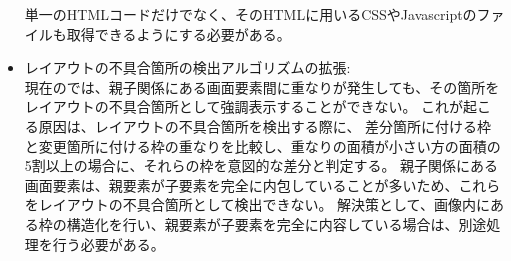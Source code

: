 \begin{itemize}
            単一のHTMLコードだけでなく、そのHTMLに用いるCSSやJavascriptのファイルも取得できるようにする必要がある。
      \item レイアウトの不具合箇所の検出アルゴリズムの拡張:\\
            現在の\toolName では、親子関係にある画面要素間に重なりが発生しても、その箇所をレイアウトの不具合箇所として強調表示することができない。
            これが起こる原因は、レイアウトの不具合箇所を検出する際に、
            差分箇所に付ける枠と変更箇所に付ける枠の重なりを比較し、重なりの面積が小さい方の面積の5割以上の場合に、それらの枠を意図的な差分と判定する。
            親子関係にある画面要素は、親要素が子要素を完全に内包していることが多いため、これらをレイアウトの不具合箇所として検出できない。
            解決策として、画像内にある枠の構造化を行い、親要素が子要素を完全に内容している場合は、別途処理を行う必要がある。
\end{itemize}







